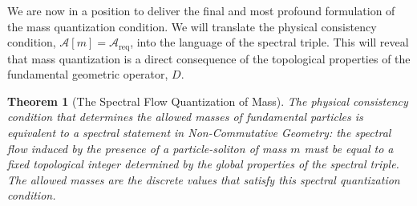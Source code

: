 \documentclass[11pt, letterpaper]{report}
\theoremstyle{plain} %
\newtheorem{theorem}{Theorem}[chapter]
\theoremstyle{definition} %
\theoremstyle{remark} %
\begin{document}
We are now in a position to deliver the final and most profound formulation of the mass quantization condition. We will translate the physical consistency condition, $\mathcal{A}[m] = \mathcal{A}_{\text{req}}$, into the language of the spectral triple. This will reveal that mass quantization is a direct consequence of the topological properties of the fundamental geometric operator, $D$.

\begin{theorem}[The Spectral Flow Quantization of Mass]
\label{thm:spectral_flow_quantization}
The physical consistency condition that determines the allowed masses of fundamental particles is equivalent to a spectral statement in Non-Commutative Geometry: the spectral flow induced by the presence of a particle-soliton of mass $m$ must be equal to a fixed topological integer determined by the global properties of the spectral triple. The allowed masses are the discrete values that satisfy this spectral quantization condition.
\end{theorem}
\end{document}
